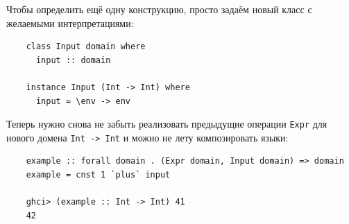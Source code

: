 Чтобы определить ещё одну конструкцию, просто задаём новый класс с желаемыми интерпретациями:
\begin{verbatim}
    class Input domain where
      input :: domain

    instance Input (Int -> Int) where
      input = \env -> env
\end{verbatim}

Теперь нужно снова не забыть реализовать предыдущие операции \texttt{Expr} для нового домена \texttt{Int -> Int} и можно не лету композировать языки:
\begin{verbatim}
    example :: forall domain . (Expr domain, Input domain) => domain
    example = cnst 1 `plus` input

    ghci> (example :: Int -> Int) 41
    42
\end{verbatim}

